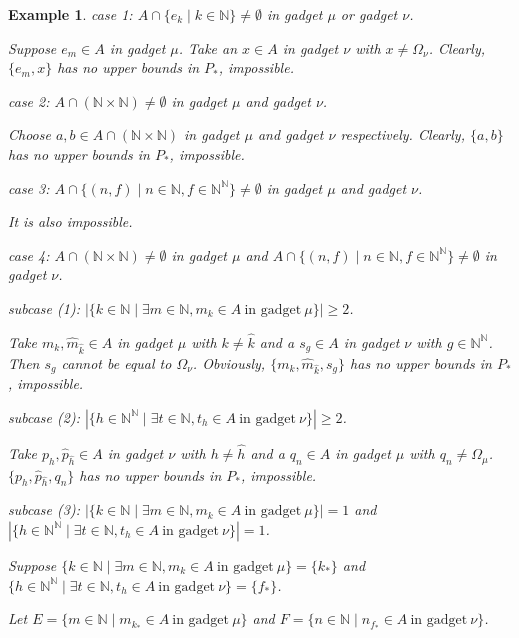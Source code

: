 \documentclass[preprint,12pt]{elsarticle}
\numberwithin{equation}{section}
\newtheorem{example}[theorem]{Example}
\begin{document}
\begin{example}
{case 1: $A\cap\{e_{k}\mid k\in\mathbb{N}\}\neq\emptyset$ in gadget $\mu$ or gadget $\nu$.

Suppose $e_{m}\in A$ in gadget $\mu$. Take an $x\in A$ in gadget $\nu$ with $x\neq\Omega_{\nu}$. Clearly, $\{e_{m},x\}$ has no upper bounds in $P_{\ast}$, impossible.

case 2: $A\cap(\mathbb{N}\times\mathbb{N})\neq\emptyset$ in gadget $\mu$ and gadget $\nu$.

Choose $a,b\in A\cap(\mathbb{N}\times\mathbb{N})$ in gadget $\mu$ and gadget $\nu$ respectively. Clearly, $\{a,b\}$ has no upper bounds in $P_{\ast}$, impossible.

case 3: $A\cap\{(n,f)\mid n\in\mathbb{N}, f\in\mathbb{N}^{\mathbb{N}}\}\neq\emptyset$ in gadget $\mu$ and gadget $\nu$.

It is also impossible.

case 4: $A\cap(\mathbb{N}\times\mathbb{N})\neq\emptyset$ in gadget $\mu$ and $A\cap\{(n,f)\mid n\in\mathbb{N}, f\in\mathbb{N}^{\mathbb{N}}\}\neq\emptyset$ in gadget $\nu$.

subcase (1): $|\{k\in\mathbb{N}\mid \exists m\in\mathbb{N}, m_{k}\in A \ \mbox{in gadget}\ \mu\}|\geq 2$.

Take $m_{k},\hat{m}_{\hat{k}}\in A$ in gadget $\mu$ with $k\neq\hat{k}$ and a $s_{g}\in A$ in gadget $\nu$ with $g\in\mathbb{N}^{\mathbb{N}}$. Then $s_{g}$ cannot be equal to $\Omega_{\nu}$. Obviously, $\{m_{k},\hat{m}_{\hat{k}},s_{g}\}$ has no upper bounds in $P_{\ast}$, impossible.

subcase (2): $|\{h\in\mathbb{N}^{\mathbb{N}}\mid \exists t\in\mathbb{N}, t_{h}\in A \ \mbox{in gadget}\ \nu\}|\geq 2$.

Take $p_{h},\hat{p}_{\hat{h}}\in A$ in gadget $\nu$ with $h\neq\hat{h}$ and a $q_{n}\in A$ in gadget $\mu$ with $q_{n}\neq\Omega_{\mu}$. $\{p_{h},\hat{p}_{\hat{h}},q_{n}\}$ has no upper bounds in $P_{\ast}$, impossible.

subcase (3): $|\{k\in\mathbb{N}\mid \exists m\in\mathbb{N}, m_{k}\in A \ \mbox{in gadget}\ \mu\}|=1$ and $|\{h\in\mathbb{N}^{\mathbb{N}}\mid \exists t\in\mathbb{N}, t_{h}\in A \ \mbox{in gadget}\ \nu\}|=1$.

Suppose $\{k\in\mathbb{N}\mid \exists m\in\mathbb{N}, m_{k}\in A \ \mbox{in gadget}\ \mu\}=\{k_{\ast}\}$ and $\{h\in\mathbb{N}^{\mathbb{N}}\mid \exists t\in\mathbb{N}, t_{h}\in A \ \mbox{in gadget}\ \nu\}=\{f_{\ast}\}$.

Let $E=\{m\in\mathbb{N}\mid m_{k_{\ast}}\in A\ \mbox{in gadget}\ \mu\}$ and $F=\{n\in\mathbb{N}\mid n_{f_{\ast}}\in A\ \mbox{in gadget}\ \nu\}$.

}
\end{example}
\end{document}
